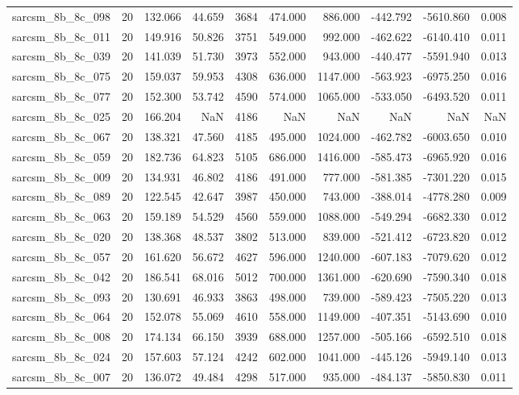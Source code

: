 \begin{tabular}{lrrrrrrrrr}
sarcsm\_8b\_8c\_098 & 20 & 132.066 & 44.659 & 3684 & 474.000 & 886.000 & -442.792 & -5610.860 & 0.008 \\
sarcsm\_8b\_8c\_011 & 20 & 149.916 & 50.826 & 3751 & 549.000 & 992.000 & -462.622 & -6140.410 & 0.011 \\
sarcsm\_8b\_8c\_039 & 20 & 141.039 & 51.730 & 3973 & 552.000 & 943.000 & -440.477 & -5591.940 & 0.013 \\
sarcsm\_8b\_8c\_075 & 20 & 159.037 & 59.953 & 4308 & 636.000 & 1147.000 & -563.923 & -6975.250 & 0.016 \\
sarcsm\_8b\_8c\_077 & 20 & 152.300 & 53.742 & 4590 & 574.000 & 1065.000 & -533.050 & -6493.520 & 0.011 \\
sarcsm\_8b\_8c\_025 & 20 & 166.204 & NaN & 4186 & NaN & NaN & NaN & NaN & NaN \\
sarcsm\_8b\_8c\_067 & 20 & 138.321 & 47.560 & 4185 & 495.000 & 1024.000 & -462.782 & -6003.650 & 0.010 \\
sarcsm\_8b\_8c\_059 & 20 & 182.736 & 64.823 & 5105 & 686.000 & 1416.000 & -585.473 & -6965.920 & 0.016 \\
sarcsm\_8b\_8c\_009 & 20 & 134.931 & 46.802 & 4186 & 491.000 & 777.000 & -581.385 & -7301.220 & 0.015 \\
sarcsm\_8b\_8c\_089 & 20 & 122.545 & 42.647 & 3987 & 450.000 & 743.000 & -388.014 & -4778.280 & 0.009 \\
sarcsm\_8b\_8c\_063 & 20 & 159.189 & 54.529 & 4560 & 559.000 & 1088.000 & -549.294 & -6682.330 & 0.012 \\
sarcsm\_8b\_8c\_020 & 20 & 138.368 & 48.537 & 3802 & 513.000 & 839.000 & -521.412 & -6723.820 & 0.012 \\
sarcsm\_8b\_8c\_057 & 20 & 161.620 & 56.672 & 4627 & 596.000 & 1240.000 & -607.183 & -7079.620 & 0.012 \\
sarcsm\_8b\_8c\_042 & 20 & 186.541 & 68.016 & 5012 & 700.000 & 1361.000 & -620.690 & -7590.340 & 0.018 \\
sarcsm\_8b\_8c\_093 & 20 & 130.691 & 46.933 & 3863 & 498.000 & 739.000 & -589.423 & -7505.220 & 0.013 \\
sarcsm\_8b\_8c\_064 & 20 & 152.078 & 55.069 & 4610 & 558.000 & 1149.000 & -407.351 & -5143.690 & 0.010 \\
sarcsm\_8b\_8c\_008 & 20 & 174.134 & 66.150 & 3939 & 688.000 & 1257.000 & -505.166 & -6592.510 & 0.018 \\
sarcsm\_8b\_8c\_024 & 20 & 157.603 & 57.124 & 4242 & 602.000 & 1041.000 & -445.126 & -5949.140 & 0.013 \\
sarcsm\_8b\_8c\_007 & 20 & 136.072 & 49.484 & 4298 & 517.000 & 935.000 & -484.137 & -5850.830 & 0.011 \\

\end{tabular}
